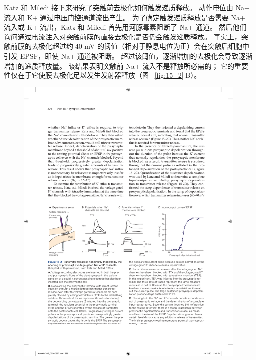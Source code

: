Katz 和 Miledi 接下来研究了突触前去极化如何触发递质释放。
动作电位由 Na+ 流入和 K+ 通过电压门控通道流出产生。
为了确定触发递质释放是否需要 Na+ 流入或 K+ 流出，Katz 和 Miledi 首先用河豚毒素阻断了 Na+ 通道。
然后他们询问通过电流注入对突触前膜的直接去极化是否仍会触发递质释放。
事实上，突触前膜的去极化超过约 40 mV 的阈值（相对于静息电位为正）会在突触后细胞中引发 EPSP，即使 Na+ 通道被阻断。
超过该阈值，逐渐增加的去极化会导致逐渐增加的递质释放量。
该结果表明突触前 Na+ 流入不是释放所必需的；
它的重要性仅在于它使膜去极化足以发生发射器释放（图 ~\ref{fig:15_2} B）。


\begin{figure}[htbp]
	\centering
	\includegraphics[width=0.95\linewidth]{chap15/fig_15_2}

\end{figure}
